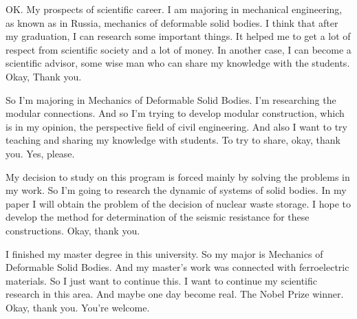 \documentclass[main.tex]{subfiles}
\begin{document}
OK.
My prospects of scientific career.
I am majoring in mechanical engineering, as known as in Russia, mechanics of deformable solid bodies.
I think that after my graduation, I can research some important things.
It helped me to get a lot of respect from scientific society and a lot of money.
In another case, I can become a scientific advisor, some wise man who can share my knowledge with the students.
Okay, Thank you.

So I'm majoring in Mechanics of Deformable Solid Bodies.
I'm researching the modular connections.
And so I'm trying to develop modular construction, which is in my opinion, the perspective field of civil engineering.
And also I want to try teaching and sharing my knowledge with students.
To try to share, okay, thank you.
Yes, please.

My decision to study on this program is forced mainly by solving the problems in my work.
So I'm going to research the dynamic of systems of solid bodies.
In my paper I will obtain the problem of the decision of nuclear waste storage.
I hope to develop the method for determination of the seismic resistance for these constructions.
Okay, thank you.

I finished my master degree in this university.
So my major is Mechanics of Deformable Solid Bodies.
And my master's work was connected with ferroelectric materials.
So I just want to continue this.
I want to continue my scientific research in this area.
And maybe one day become real.
The Nobel Prize winner.
Okay, thank you.
You're welcome.
\end{document}
